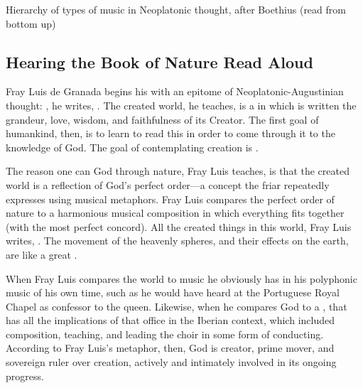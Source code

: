 {Hierarchy of types of music in Neoplatonic thought, after Boethius (read from
bottom up)}

\subsection{Hearing the Book of Nature Read Aloud}

Fray Luis de Granada begins his  with an
epitome of Neoplatonic-Augustinian thought: , he writes, .%
    \Autocite[182]{LuisdeGranada:Simbolo}
The created world, he teaches, is a  in which is written
the grandeur, love, wisdom, and faithfulness of its Creator.
The first goal of humankind, then, is to learn to read this  in order to come through it to the knowledge of God. 
The goal of contemplating creation is .%
    \Autocite[184]{LuisdeGranada:Simbolo}

The reason one can  God through nature, Fray Luis teaches, is that
the created world is a reflection of God's perfect order---a concept the friar
repeatedly expresses using musical metaphors.
Fray Luis compares the perfect order of nature to a harmonious musical
composition in which everything fits together 
(with the most perfect concord).
All the created things in this world, Fray Luis writes, .%
    \Autocite[191]{LuisdeGranada:Simbolo}
The movement of the heavenly spheres, and their effects on the earth, are like
a great .%
    \Autocite[191]{LuisdeGranada:Simbolo}

When Fray Luis compares the world to music  he
obviously has in his  polyphonic music of his own time, such
as he would have heard at the Portuguese Royal Chapel as confessor to the
queen.
Likewise, when he compares God to a , that has all
the implications of that office in the Iberian context, which included
composition, teaching, and leading the choir in some form of conducting.
According to Fray Luis's metaphor, then, God is creator, prime mover, and
sovereign ruler over creation, actively and intimately involved in its ongoing
progress.

